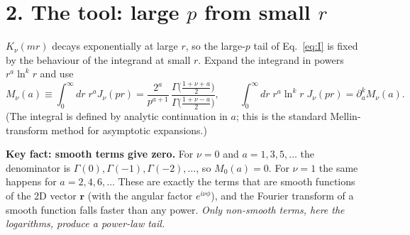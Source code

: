 \documentclass[12pt]{article}
\begin{document}
\section*{2. The tool: large $p$ from small $r$}

$K_\nu(mr)$ decays exponentially at large $r$, so the large-$p$ tail of Eq.~\eqref{eq:I} is fixed by
the behaviour of the integrand at small $r$. Expand the integrand in powers $r^a\ln^kr$ and use
\begin{equation}
  M_\nu(a)\equiv\int_0^\infty dr\;r^{a}J_\nu(pr)
  =\frac{2^{a}}{p^{a+1}}\,\frac{\Gamma\!\big(\tfrac{1+\nu+a}{2}\big)}{\Gamma\!\big(\tfrac{1+\nu-a}{2}\big)},
  \qquad
  \int_0^\infty dr\;r^{a}\ln^k\!r\;J_\nu(pr)=\partial_a^k M_\nu(a).
  \label{eq:mellin}
\end{equation}
(The integral is defined by analytic continuation in $a$; this is the standard Mellin-transform
method for asymptotic expansions.)

\textbf{Key fact: smooth terms give zero.} For $\nu=0$ and $a=1,3,5,\dots$ the denominator is
$\Gamma(0),\Gamma(-1),\Gamma(-2),\dots$, so $M_0(a)=0$. For $\nu=1$ the same happens for $a=2,4,6,\dots$
These are exactly the terms that are smooth functions of the 2D vector $\mathbf r$ (with the angular
factor $e^{i\nu\phi}$), and the Fourier transform of a smooth function falls faster than any power.
\emph{Only non-smooth terms, here the logarithms, produce a power-law tail.}
\end{document}
